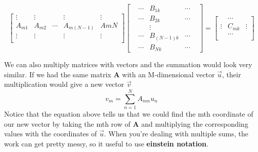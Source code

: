 \documentclass{article}
\newcommand{\be}{\begin{equation}}
\newcommand{\ee}{\end{equation}}
\begin{document}
\[
\begin{bmatrix}
  \vdots & \vdots & & \vdots & \vdots \\
  A_{m1} & A_{m2} & \cdots & A_{m(N-1)} & A{mN} \\
  \vdots & \vdots & & \vdots & \vdots \\
\end{bmatrix}
\begin{bmatrix}
  & \cdots & B_{1k} & \cdots & \\
  & \cdots & B_{2k} & \cdots & \\
  & & \vdots & & \\
  & \cdots & B_{(N-1)k} & \cdots & \\
  & \cdots & B_{Nk} & \cdots &
\end{bmatrix}
=
\begin{bmatrix}
   & \cdots & \\
  \vdots & C_{mk} & \vdots \\
   & \cdots & \\
\end{bmatrix}
\]

We can also multiply matrices with vectors and the summation would look very similar.
If we had the same matrix \textbf{A} with an M-dimensional vector $\vec{u}$, their multiplication would give a new vector $\vec{v}$
\be
  v_{m} = \sum_{n=1}^{N} A_{mn} u_{n}
\ee
Notice that the equation above tells us that we could find the mth coordinate of our new vector by taking the mth row of \textbf{A} and multiplying the corresponding values with the coordinates of $\vec{u}$.
When you're dealing with multiple sums, the work can get pretty messy, so it useful to use \textbf{einstein notation}.
\end{document}
